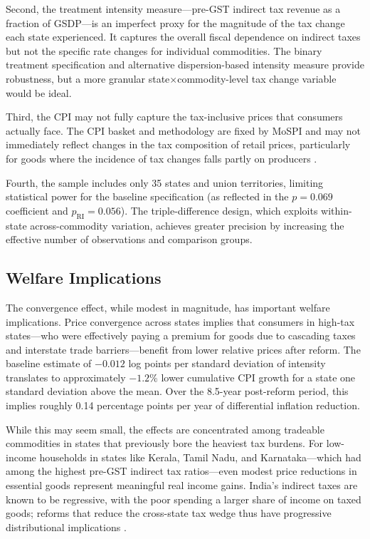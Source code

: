 \documentclass[12pt]{article}
\begin{document}
Second, the treatment intensity measure---pre-GST indirect tax revenue as a fraction of GSDP---is an imperfect proxy for the magnitude of the tax change each state experienced. It captures the overall fiscal dependence on indirect taxes but not the specific rate changes for individual commodities. The binary treatment specification and alternative dispersion-based intensity measure provide robustness, but a more granular state$\times$commodity-level tax change variable would be ideal.

Third, the CPI may not fully capture the tax-inclusive prices that consumers actually face. The CPI basket and methodology are fixed by MoSPI and may not immediately reflect changes in the tax composition of retail prices, particularly for goods where the incidence of tax changes falls partly on producers \citep{chetty2009salience}.

Fourth, the sample includes only 35 states and union territories, limiting statistical power for the baseline specification (as reflected in the $p = 0.069$ coefficient and $p_{\text{RI}} = 0.056$). The triple-difference design, which exploits within-state across-commodity variation, achieves greater precision by increasing the effective number of observations and comparison groups.

\subsection{Welfare Implications}

The convergence effect, while modest in magnitude, has important welfare implications. Price convergence across states implies that consumers in high-tax states---who were effectively paying a premium for goods due to cascading taxes and interstate trade barriers---benefit from lower relative prices after reform. The baseline estimate of $-0.012$ log points per standard deviation of intensity translates to approximately $-1.2\%$ lower cumulative CPI growth for a state one standard deviation above the mean. Over the 8.5-year post-reform period, this implies roughly 0.14 percentage points per year of differential inflation reduction.

While this may seem small, the effects are concentrated among tradeable commodities in states that previously bore the heaviest tax burdens. For low-income households in states like Kerala, Tamil Nadu, and Karnataka---which had among the highest pre-GST indirect tax ratios---even modest price reductions in essential goods represent meaningful real income gains. India's indirect taxes are known to be regressive, with the poor spending a larger share of income on taxed goods; reforms that reduce the cross-state tax wedge thus have progressive distributional implications \citep{emran2005institutions}.
\end{document}
